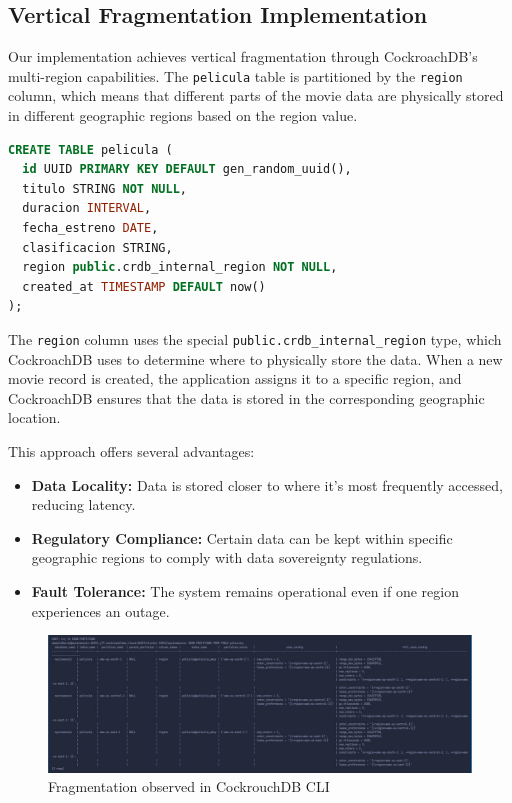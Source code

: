 \documentclass[twoside]{article}
\begin{document}
\subsection{Vertical Fragmentation Implementation}

Our implementation achieves vertical fragmentation through CockroachDB's multi-region capabilities. The \texttt{pelicula} table is partitioned by the \texttt{region} column, which means that different parts of the movie data are physically stored in different geographic regions based on the region value.

\begin{lstlisting}[language=SQL, caption=Table Schema with Region-Based Partitioning]
CREATE TABLE pelicula (
  id UUID PRIMARY KEY DEFAULT gen_random_uuid(),
  titulo STRING NOT NULL,
  duracion INTERVAL,
  fecha_estreno DATE,
  clasificacion STRING,
  region public.crdb_internal_region NOT NULL,
  created_at TIMESTAMP DEFAULT now()
);
\end{lstlisting}

The \texttt{region} column uses the special \texttt{public.crdb\_internal\_region} type, which CockroachDB uses to determine where to physically store the data. When a new movie record is created, the application assigns it to a specific region, and CockroachDB ensures that the data is stored in the corresponding geographic location.

This approach offers several advantages:
\begin{itemize}
  \item \textbf{Data Locality:} Data is stored closer to where it's most frequently accessed, reducing latency.
  \item \textbf{Regulatory Compliance:} Certain data can be kept within specific geographic regions to comply with data sovereignty regulations.
  \item \textbf{Fault Tolerance:} The system remains operational even if one region experiences an outage.
\end{itemize}

\begin{figure}[H]
  \centering
  \includegraphics[width=1\textwidth]{imgs/cli.jpeg}
  \caption{Fragmentation observed in CockrouchDB CLI}
  \label{fig:3}
\end{figure}
\end{document}
